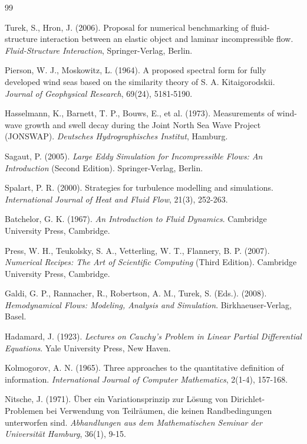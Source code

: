 ﻿\documentclass[a4paper,11pt]{article}
\theoremstyle{definition}
\begin{document}
\begin{thebibliography}{99}

 Turek, S., Hron, J. (2006). Proposal for numerical benchmarking of fluid-structure interaction between an elastic object and laminar incompressible flow. \textit{Fluid-Structure Interaction}, Springer-Verlag, Berlin.

 Pierson, W. J., Moskowitz, L. (1964). A proposed spectral form for fully developed wind seas based on the similarity theory of S. A. Kitaigorodskii. \textit{Journal of Geophysical Research}, 69(24), 5181-5190.

 Hasselmann, K., Barnett, T. P., Bouws, E., et al. (1973). Measurements of wind-wave growth and swell decay during the Joint North Sea Wave Project (JONSWAP). \textit{Deutsches Hydrographisches Institut}, Hamburg.

 Sagaut, P. (2005). \textit{Large Eddy Simulation for Incompressible Flows: An Introduction} (Second Edition). Springer-Verlag, Berlin.

 Spalart, P. R. (2000). Strategies for turbulence modelling and simulations. \textit{International Journal of Heat and Fluid Flow}, 21(3), 252-263.

 Batchelor, G. K. (1967). \textit{An Introduction to Fluid Dynamics}. Cambridge University Press, Cambridge.

 Press, W. H., Teukolsky, S. A., Vetterling, W. T., Flannery, B. P. (2007). \textit{Numerical Recipes: The Art of Scientific Computing} (Third Edition). Cambridge University Press, Cambridge.

 Galdi, G. P., Rannacher, R., Robertson, A. M., Turek, S. (Eds.). (2008). \textit{Hemodynamical Flows: Modeling, Analysis and Simulation}. Birkhaeuser-Verlag, Basel.

 Hadamard, J. (1923). \textit{Lectures on Cauchy's Problem in Linear Partial Differential Equations}. Yale University Press, New Haven.

 Kolmogorov, A. N. (1965). Three approaches to the quantitative definition of information. \textit{International Journal of Computer Mathematics}, 2(1-4), 157-168.

 Nitsche, J. (1971). Über ein Variationsprinzip zur Lösung von Dirichlet-Problemen bei Verwendung von Teilräumen, die keinen Randbedingungen unterworfen sind. \textit{Abhandlungen aus dem Mathematischen Seminar der Universität Hamburg}, 36(1), 9-15.


\end{thebibliography}
\end{document}
